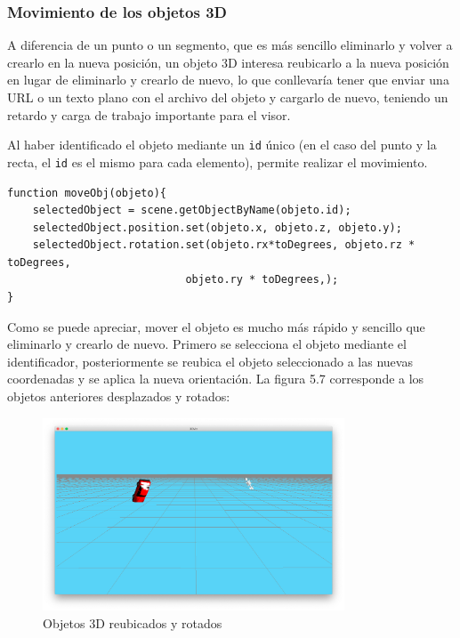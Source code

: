 \subsubsection{Movimiento de los objetos 3D}
A diferencia de un punto o un segmento, que es más sencillo eliminarlo y volver a crearlo en la nueva posición, un objeto 3D interesa reubicarlo a la nueva posición en lugar de eliminarlo y crearlo de nuevo, lo que conllevaría tener que enviar una URL o un texto plano con el archivo del objeto y cargarlo de nuevo, teniendo un retardo y carga de trabajo importante para el visor.

Al haber identificado el objeto mediante un \texttt{id} único (en el caso del punto y la recta, el \texttt{id} es el mismo para cada elemento), permite realizar el movimiento.
\begin{lstlisting}[caption= Código para realizar el movimiento de los objetos 3D, label=cod.moverobjetos]
function moveObj(objeto){
	selectedObject = scene.getObjectByName(objeto.id);
	selectedObject.position.set(objeto.x, objeto.z, objeto.y);
	selectedObject.rotation.set(objeto.rx*toDegrees, objeto.rz * toDegrees, 
							objeto.ry * toDegrees,);
}
\end{lstlisting}
Como se puede apreciar, mover el objeto es mucho más rápido y sencillo que eliminarlo y crearlo de nuevo. Primero se selecciona el objeto mediante el identificador, posteriormente se reubica el objeto seleccionado a las nuevas coordenadas y se aplica la nueva orientación. La figura 5.7 corresponde a los objetos anteriores desplazados y rotados:
\begin{figure}[H]
  \begin{center}
    \includegraphics[width=0.8\textwidth]{figures/movermodelos.png}
		\caption{Objetos 3D reubicados y rotados}
		\label{fig.movermodelos}
		\end{center}
\end{figure}

